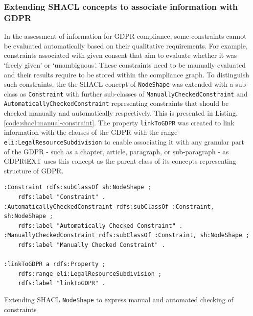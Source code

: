 \subsubsection{Extending SHACL concepts to associate information with GDPR}
In the assessment of information for GDPR compliance, some constraints cannot be evaluated automatically based on their qualitative requirements. For example, constraints associated with given consent that aim to evaluate whether it was `freely given' or `unambiguous'. These constraints need to be manually evaluated and their results require to be stored within the compliance graph.
To distinguish such constraints, the the SHACL concept of \texttt{NodeShape} was extended with a sub-class as \texttt{Constraint} with further sub-classes of \texttt{ManuallyCheckedConstraint} and \texttt{AutomaticallyCheckedConstraint} representing constraints that should be checked manually and automatically respectively. This is presented in Listing.\autoref{code:shacl:manual-constraint}.
The property \texttt{linkToGDPR} was created to link information with the clauses of the GDPR with the range \texttt{eli:LegalResourceSubdivision} to enable associating it with any granular part of the GDPR - such as a chapter, article, paragraph, or sub-paragraph - as GDPRtEXT uses this concept as the parent class of its concepts representing structure of GDPR.
\begin{listing}[htbp]
\begin{verbatim}
:Constraint rdfs:subClassOf sh:NodeShape ;
    rdfs:label "Constraint" .
:AutomaticallyCheckedConstraint rdfs:subClassOf :Constraint, sh:NodeShape ;
    rdfs:label "Automatically Checked Constraint" .
:ManuallyCheckedConstraint rdfs:subClassOf :Constraint, sh:NodeShape ;
    rdfs:label "Manually Checked Constraint" .
    
:linkToGDPR a rdfs:Property ;
    rdfs:range eli:LegalResourceSubdivision ;
    rdfs:label "linkToGDPR" .
\end{verbatim}
\caption{Extending SHACL \texttt{NodeShape} to express manual and automated checking of constraints}
\label{code:shacl:manual-constraint}
\end{listing}

